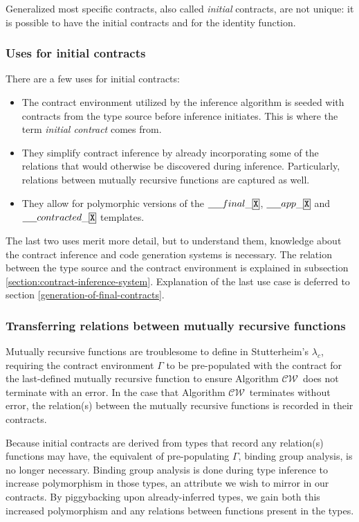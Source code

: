 \documentclass[10pt]{report}
\newcommand{\CW}{$\mathcal{CW}$}
\newcommand{\ctrttemplate}{\underline{\hspace{1.5em}}contracted\_\code{X}}
\newcommand{\finaltemplate}{\underline{\hspace{1.5em}}final\_\code{X}}
\newcommand{\apptemplate}{\underline{\hspace{1.5em}}app\_\code{X}}
\newcommand{\code}[1]{%
  {%
   \setlength{\fboxsep}{-2\fboxrule}%
   \fcolorbox{black}{light-gray}{\hspace{1.5pt}\strut\texttt{#1}\hspace{1.5pt}}%
  }%
}
\begin{document}
Generalized most specific contracts, also called \textit{initial} contracts, are not unique: it is possible to have the initial contracts \code{c$_0$ $\rightarrowtail$ c$_0$} and \code{c$_1$ $\rightarrowtail$ c$_1$} for the identity function.

\subsubsection{Uses for initial contracts}

There are a few uses for initial contracts:

\begin{itemize}
	\item The contract environment utilized by the inference algorithm is seeded with contracts from the type source before inference initiates. This is where the term \textit{initial contract} comes from. 
	\item They simplify contract inference by already incorporating some of the relations that would otherwise be discovered during inference. Particularly, relations between mutually recursive functions are captured as well.
	\item They allow for polymorphic versions of the $\finaltemplate$, $\apptemplate$ and $\ctrttemplate$ templates. 
\end{itemize}

The last two uses merit more detail, but to understand them, knowledge about the contract inference and code generation systems is necessary.
The relation between the type source and the contract environment is explained in subsection \ref{section:contract-inference-system}.
Explanation of the last use case is deferred to section \ref{generation-of-final-contracts}.

\subsubsection{Transferring relations between mutually recursive functions}

Mutually recursive functions are troublesome to define in Stutterheim's $\lambda_c$, requiring the contract environment $\Gamma$ to be pre-populated with the contract for the last-defined mutually recursive function to ensure Algorithm \CW ~does not terminate with an error.
In the case that Algorithm \CW ~terminates without error, the relation(s) between the mutually recursive functions is recorded in their contracts.

Because initial contracts are derived from types that record any relation(s) functions may have, the equivalent of pre-populating $\Gamma$, binding group analysis, is no longer necessary.
Binding group analysis is done during type inference to increase polymorphism in those types, an attribute we wish to mirror in our contracts.
By piggybacking upon already-inferred types, we gain both this increased polymorphism and any relations between functions present in the types.
\end{document}
